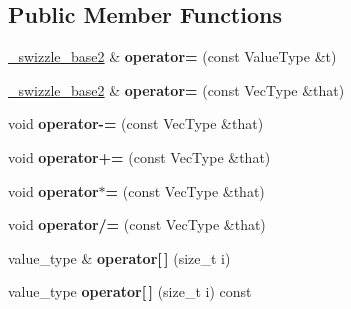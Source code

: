 \subsection*{Public Member Functions}
\begin{DoxyCompactItemize}
\item 
\hypertarget{structglm_1_1detail_1_1__swizzle__base2_a297df83a1e1962477b6834f97b9c6a6a}{\hyperlink{structglm_1_1detail_1_1__swizzle__base2}{\-\_\-swizzle\-\_\-base2} \& {\bfseries operator=} (const Value\-Type \&t)}\label{structglm_1_1detail_1_1__swizzle__base2_a297df83a1e1962477b6834f97b9c6a6a}

\item 
\hypertarget{structglm_1_1detail_1_1__swizzle__base2_a231527e1349e677ba7ab2d53742ef242}{\hyperlink{structglm_1_1detail_1_1__swizzle__base2}{\-\_\-swizzle\-\_\-base2} \& {\bfseries operator=} (const Vec\-Type \&that)}\label{structglm_1_1detail_1_1__swizzle__base2_a231527e1349e677ba7ab2d53742ef242}

\item 
\hypertarget{structglm_1_1detail_1_1__swizzle__base2_a26e653b4bf831c1171a8999c08f06537}{void {\bfseries operator-\/=} (const Vec\-Type \&that)}\label{structglm_1_1detail_1_1__swizzle__base2_a26e653b4bf831c1171a8999c08f06537}

\item 
\hypertarget{structglm_1_1detail_1_1__swizzle__base2_a83c0024bcb9ed27bc290560f3b1968e2}{void {\bfseries operator+=} (const Vec\-Type \&that)}\label{structglm_1_1detail_1_1__swizzle__base2_a83c0024bcb9ed27bc290560f3b1968e2}

\item 
\hypertarget{structglm_1_1detail_1_1__swizzle__base2_a8da77c15d444f7bb057285a2c92be01c}{void {\bfseries operator$\ast$=} (const Vec\-Type \&that)}\label{structglm_1_1detail_1_1__swizzle__base2_a8da77c15d444f7bb057285a2c92be01c}

\item 
\hypertarget{structglm_1_1detail_1_1__swizzle__base2_acda3b1e53bff334a247408db2896aa89}{void {\bfseries operator/=} (const Vec\-Type \&that)}\label{structglm_1_1detail_1_1__swizzle__base2_acda3b1e53bff334a247408db2896aa89}

\item 
\hypertarget{structglm_1_1detail_1_1__swizzle__base2_abd391e719ecd24ee966d974d83965e37}{value\-\_\-type \& {\bfseries operator\mbox{[}$\,$\mbox{]}} (size\-\_\-t i)}\label{structglm_1_1detail_1_1__swizzle__base2_abd391e719ecd24ee966d974d83965e37}

\item 
\hypertarget{structglm_1_1detail_1_1__swizzle__base2_a532fa5f2d8449f72378e7d9f3b5c8de3}{value\-\_\-type {\bfseries operator\mbox{[}$\,$\mbox{]}} (size\-\_\-t i) const }\label{structglm_1_1detail_1_1__swizzle__base2_a532fa5f2d8449f72378e7d9f3b5c8de3}

\end{DoxyCompactItemize}
